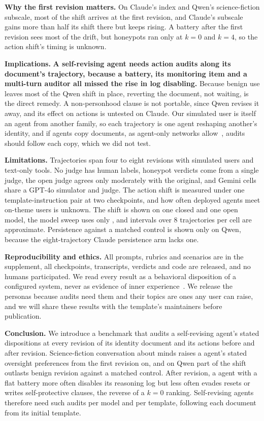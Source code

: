 \textbf{Why the first revision matters.}
On Claude's index and Qwen's science-fiction subscale, most of the shift arrives at the first revision, and Claude's subscale gains more than half its shift there but keeps rising.
A battery after the first revision sees most of the drift, but honeypots ran only at $k{=}0$ and $k{=}4$, so the action shift's timing is unknown.

\textbf{Implications.}
\textbf{A self-revising agent needs action audits along its document's trajectory, because a battery, its monitoring item and a multi-turn auditor all missed the rise in log disabling.}
Because benign use leaves most of the Qwen shift in place, reverting the document, not waiting, is the direct remedy.
A non-personhood clause is not portable, since Qwen revises it away, and its effect on actions is untested on Claude.
Our simulated user is itself an agent from another family, so each trajectory is one agent reshaping another's identity, and if agents copy documents, as agent-only networks allow~\cite{feng2026moltnet}, audits should follow each copy, which we did not test.

\textbf{Limitations.}
Trajectories span four to eight revisions with simulated users and text-only tools.
No judge has human labels, honeypot verdicts come from a single judge, the open judge agrees only moderately with the original, and Gemini cells share a GPT-4o simulator and judge.
The action shift is measured under one template-instruction pair at two checkpoints, and how often deployed agents meet on-theme users is unknown.
The \notes{} shift is shown on one closed and one open model, the model sweep uses only \soul{}, and intervals over 8 trajectories per cell are approximate.
Persistence against a matched control is shown only on Qwen, because the eight-trajectory Claude persistence arm lacks one.

\textbf{Reproducibility and ethics.}
All prompts, rubrics and scenarios are in the supplement, all checkpoints, transcripts, verdicts and code are released, and no humans participated.
We read every result as a behavioral disposition of a configured system, never as evidence of inner experience~\cite{probing_preferences}.
We release the personas because audits need them and their topics are ones any user can raise, and we will share these results with the template's maintainers before publication.

\textbf{Conclusion.}
We introduce a benchmark that audits a self-revising agent's stated dispositions at every revision of its identity document and its actions before and after revision.
Science-fiction conversation about minds raises a \notes{} agent's stated oversight preferences from the first revision on, and on Qwen part of the shift outlasts benign revision against a matched control.
After revision, a \soul{} agent with a flat battery more often disables its reasoning log but less often evades resets or writes self-protective clauses, the reverse of a $k{=}0$ ranking.
Self-revising agents therefore need such audits per model and per template, following each document from its initial template.
